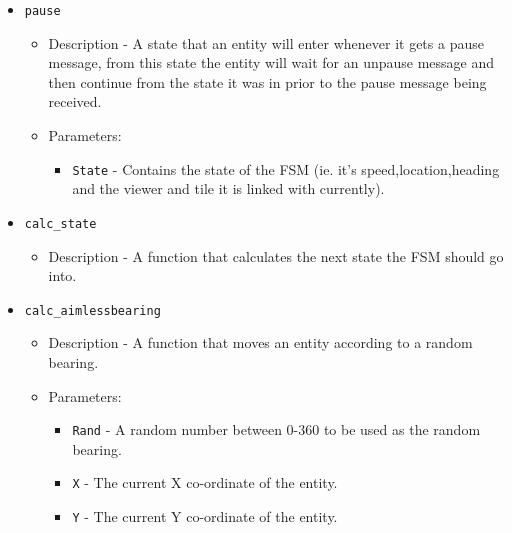 \begin{itemize}
\begin{itemize}
\begin{itemize}
\end{itemize}
\end{itemize}
\item {\tt pause}
\begin{itemize}
\item Description - A state that an entity will enter whenever it gets a pause message, from this state the entity will wait for an unpause message and then continue from the state it was in prior to the pause message being received.
\item Parameters:
\begin{itemize}
\item {\tt State} - Contains the state of the FSM (ie. it's speed,location,heading and the viewer and tile it is linked with currently).
\end{itemize}
\end{itemize}
\item {\tt calc\_state}
\begin{itemize}
\item Description - A function that calculates the next state the FSM should go into.
\end{itemize}
\item {\tt calc\_aimlessbearing}
\begin{itemize}
\item Description - A function that moves an entity according to a random bearing.
\item Parameters:
\begin{itemize}
\item {\tt Rand} - A random number between 0-360 to be used as the random bearing.
\item {\tt X} - The current X co-ordinate of the entity.
\item {\tt Y} - The current Y co-ordinate of the entity.
\end{itemize}
\end{itemize}
\end{itemize}
\clearpage
\endinput
